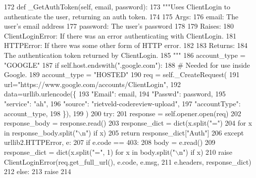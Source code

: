 \begin{DoxyCode}
172   \textcolor{keyword}{def }\_GetAuthToken(self, email, password):
173     \textcolor{stringliteral}{"""Uses ClientLogin to authenticate the user, returning an auth token.}
174 \textcolor{stringliteral}{}
175 \textcolor{stringliteral}{    Args:}
176 \textcolor{stringliteral}{      email:    The user's email address}
177 \textcolor{stringliteral}{      password: The user's password}
178 \textcolor{stringliteral}{}
179 \textcolor{stringliteral}{    Raises:}
180 \textcolor{stringliteral}{      ClientLoginError: If there was an error authenticating with ClientLogin.}
181 \textcolor{stringliteral}{      HTTPError: If there was some other form of HTTP error.}
182 \textcolor{stringliteral}{}
183 \textcolor{stringliteral}{    Returns:}
184 \textcolor{stringliteral}{      The authentication token returned by ClientLogin.}
185 \textcolor{stringliteral}{    """}
186     account\_type = \textcolor{stringliteral}{"GOOGLE"}
187     \textcolor{keywordflow}{if} self.host.endswith(\textcolor{stringliteral}{".google.com"}):
188       \textcolor{comment}{# Needed for use inside Google.}
189       account\_type = \textcolor{stringliteral}{"HOSTED"}
190     req = self.\_CreateRequest(
191         url=\textcolor{stringliteral}{"https://www.google.com/accounts/ClientLogin"},
192         data=urllib.urlencode(\{
193             \textcolor{stringliteral}{"Email"}: email,
194             \textcolor{stringliteral}{"Passwd"}: password,
195             \textcolor{stringliteral}{"service"}: \textcolor{stringliteral}{"ah"},
196             \textcolor{stringliteral}{"source"}: \textcolor{stringliteral}{"rietveld-codereview-upload"},
197             \textcolor{stringliteral}{"accountType"}: account\_type,
198         \}),
199     )
200     \textcolor{keywordflow}{try}:
201       response = self.opener.open(req)
202       response\_body = response.read()
203       response\_dict = dict(x.split(\textcolor{stringliteral}{"="})
204                            \textcolor{keywordflow}{for} x \textcolor{keywordflow}{in} response\_body.split(\textcolor{stringliteral}{"\(\backslash\)n"}) \textcolor{keywordflow}{if} x)
205       \textcolor{keywordflow}{return} response\_dict[\textcolor{stringliteral}{"Auth"}]
206     \textcolor{keywordflow}{except} urllib2.HTTPError, e:
207       \textcolor{keywordflow}{if} e.code == 403:
208         body = e.read()
209         response\_dict = dict(x.split(\textcolor{stringliteral}{"="}, 1) \textcolor{keywordflow}{for} x \textcolor{keywordflow}{in} body.split(\textcolor{stringliteral}{"\(\backslash\)n"}) \textcolor{keywordflow}{if} x)
210         \textcolor{keywordflow}{raise} ClientLoginError(req.get\_full\_url(), e.code, e.msg,
211                                e.headers, response\_dict)
212       \textcolor{keywordflow}{else}:
213         \textcolor{keywordflow}{raise}
214 
\end{DoxyCode}

